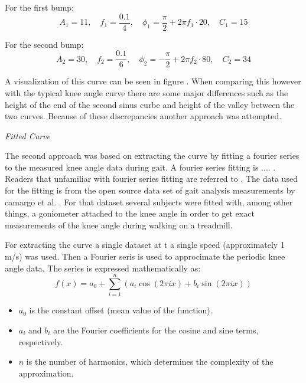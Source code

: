 For the first bump:
\[
A_1 = 11, \quad f_1 = \frac{0.1}{4}, \quad \phi_1 = \frac{\pi}{2} + 2\pi f_1 \cdot 20, \quad C_1 = 15
\]

For the second bump:
\[
A_2 = 30, \quad f_2 = \frac{0.1}{6}, \quad \phi_2 = -\frac{\pi}{2} + 2\pi f_2 \cdot 80, \quad C_2 = 34
\]

A visualization of this curve can be seen in figure . When comparing this however with the typical knee angle curve there are some major differences such as the height of the end of the second sinus curbe and height of the valley between the two curves. Because of these discrepancies another approach was attempted.
\newline

\textit{Fitted Curve}

The second approach was based on extracting the curve by fitting a fourier series to the measured knee angle data during gait. A fourier series fitting is .... . Readers that unfamiliar with fourier series fitting are referred to . The data used for the fitting is from the open source data set of gait analysis measurements by camargo et al. \cite{camargo_comprehensive_2021}. For that dataset several subjects were fitted with, among other things, a goniometer attached to the knee angle in order to get exact measurements of the knee angle during walking on a treadmill. 


For extracting the curve a single dataset at t a single speed (approximately 1 m/s) was used. Then a Fourier seris is used to approcimate the periodic knee angle data. The series is expressed mathematically as:
\begin{equation}
f(x) = a_0 + \sum_{i=1}^{n} \left( a_i \cos(2\pi i x) + b_i \sin(2\pi i x) \right)
\end{equation}

\begin{itemize}
    \item \(a_0\) is the constant offset (mean value of the function).
    \item \(a_i\) and \(b_i\) are the Fourier coefficients for the cosine and sine terms, respectively.
    \item \(n\) is the number of harmonics, which determines the complexity of the approximation.
\end{itemize}


